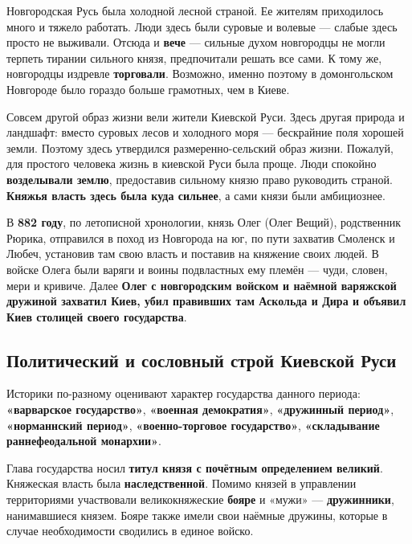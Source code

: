 \documentclass{article}
\begin{document}
Новгородская Русь была холодной лесной страной. Ее жителям приходилось много и тяжело работать. Люди здесь были суровые и волевые — слабые здесь просто не выживали. Отсюда и \textbf{вече} — сильные духом новгородцы не могли терпеть тирании сильного князя, предпочитали решать все сами. К тому же, новгородцы издревле \textbf{торговали}. Возможно, именно поэтому в домонгольском Новгороде было гораздо больше грамотных, чем в Киеве.

\hfill

Совсем другой образ жизни вели жители Киевской Руси. Здесь другая природа и ландшафт: вместо суровых лесов и холодного моря — бескрайние поля хорошей земли. Поэтому здесь утвердился размеренно-сельский образ жизни. Пожалуй, для простого человека жизнь в киевской Руси была проще. Люди спокойно \textbf{возделывали землю}, предоставив сильному князю право руководить страной. \textbf{Княжья власть здесь была куда сильнее}, а сами князи были амбициознее.

\hfill

В \textbf{882 году}, по летописной хронологии, князь Олег (Олег Вещий), родственник Рюрика, отправился в поход из Новгорода на юг, по пути захватив Смоленск и Любеч, установив там свою власть и поставив на княжение своих людей. В войске Олега были варяги и воины подвластных ему племён — чуди, словен, мери и кривиче. Далее \textbf{Олег с новгородским войском и наёмной варяжской дружиной захватил Киев, убил правивших там Аскольда и Дира и объявил Киев столицей своего государства}.

\subsection{Политический и сословный строй Киевской Руси}

Историки по-разному оценивают характер государства данного периода: \textbf{«варварское государство»}, \textbf{«военная демократия»}, \textbf{«дружинный период»}, \textbf{«норманнский период»}, \textbf{«военно-торговое государство»}, \textbf{«складывание раннефеодальной монархии»}.

\hfill

Глава государства носил \textbf{титул князя с почётным определением великий}. Княжеская власть была \textbf{наследственной}. Помимо князей в управлении территориями участвовали великокняжеские \textbf{бояре} и «мужи» — \textbf{дружинники}, нанимавшиеся князем. Бояре также имели свои наёмные дружины, которые в случае необходимости сводились в единое войско.
\end{document}
